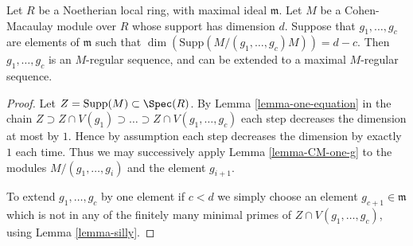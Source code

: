 \begin{proposition}
\label{proposition-CM-module}
Let $R$ be a Noetherian local ring, with maximal ideal $\mathfrak m$.
Let $M$ be a Cohen-Macaulay module over $R$ whose support has dimension $d$.
Suppose that $g_1, \ldots, g_c$ are elements of
$\mathfrak m$ such that $\dim(\text{Supp}(M/(g_1, \ldots, g_c)M))
= d - c$. Then $g_1, \ldots, g_c$ is an $M$-regular sequence,
and can be extended to a maximal $M$-regular sequence.
\end{proposition}

\begin{proof}
Let $Z = \text{Supp}(M) \subset \Spec(R)$.
By Lemma \ref{lemma-one-equation} in the chain
$Z \supset Z \cap V(g_1) \supset \ldots \supset Z \cap V(g_1, \ldots, g_c)$
each step decreases the dimension at most by $1$. Hence by assumption
each step decreases the dimension by exactly $1$ each time. Thus we
may successively apply Lemma \ref{lemma-CM-one-g} to the modules
$M/(g_1, \ldots, g_i)$ and the element $g_{i + 1}$.

\medskip\noindent
To extend $g_1, \ldots, g_c$ by one element if $c < d$ we simply
choose an element $g_{c + 1} \in \mathfrak m$ which is not
in any of the finitely many minimal primes of $Z \cap V(g_1, \ldots, g_c)$,
using Lemma \ref{lemma-silly}.
\end{proof}
